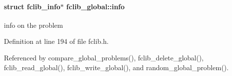 \paragraph[{info}]{\setlength{\rightskip}{0pt plus 5cm}struct {\bf fclib\+\_\+info}$\ast$ fclib\+\_\+global\+::info}\label{structfclib__global_aa6b4e80afc92dd1a9b260ff3a096b352}


info on the problem 



Definition at line 194 of file fclib.\+h.



Referenced by compare\+\_\+global\+\_\+problems(), fclib\+\_\+delete\+\_\+global(), fclib\+\_\+read\+\_\+global(), fclib\+\_\+write\+\_\+global(), and random\+\_\+global\+\_\+problem().

